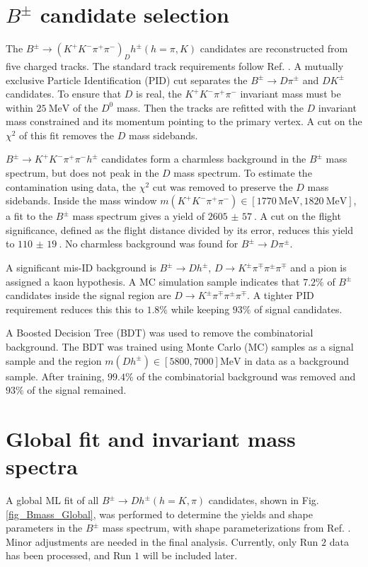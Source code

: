 \documentclass[12pt, a4paper, notitlepage, onecolumn]{article}
\begin{document}
\section{\texorpdfstring{$B^\pm$}{B} candidate selection}
\noindent The $B^\pm\to (K^+K^-\pi^+\pi^-)_Dh^\pm (h = \pi, K)$ candidates are reconstructed from five charged tracks. The standard track requirements follow Ref. \cite{cite_LHCbGGSZKSpipi}. A mutually exclusive Particle Identification (PID) cut separates the $B^\pm\to D\pi^\pm$ and $DK^\pm$ candidates. To ensure that $D$ is real, the $K^+K^-\pi^+\pi^-$ invariant mass must be within $\SI{25}{\mega\eV}$ of the $D^0$ mass. Then the tracks are refitted with the $D$ invariant mass constrained and its momentum pointing to the primary vertex. A cut on the $\chi^2$ of this fit removes the $D$ mass sidebands.

$B^\pm\to K^+K^-\pi^+\pi^-h^\pm$ candidates form a charmless background in the $B^\pm$ mass spectrum, but does not peak in the $D$ mass spectrum. To estimate the contamination using data, the $\chi^2$ cut was removed to preserve the $D$ mass sidebands. Inside the mass window $m(K^+K^-\pi^+\pi^-)\in[\SI{1770}{\mega\eV}, \SI{1820}{\mega\eV}]$, a fit to the $B^\pm$ mass spectrum gives a yield of $\SI{2605(57)}{}$. A cut on the flight significance, defined as the flight distance divided by its error, reduces this yield to $\SI{110(19)}{}$. No charmless background was found for $B^\pm\to D\pi^\pm$.

A significant mis-ID background is $B^\pm\to Dh^\pm$, $D\to K^\pm\pi^\mp\pi^\pm\pi^\mp$ and a pion is assigned a kaon hypothesis. A MC simulation sample indicates that $7.2\%$ of $B^\pm$ candidates inside the signal region are $D\to K^\pm\pi^\mp\pi^\pm\pi^\mp$. A tighter PID requirement reduces this this to $1.8\%$ while keeping $93\%$ of signal candidates.

A Boosted Decision Tree (BDT) was used to remove the combinatorial background. The BDT was trained using Monte Carlo (MC) samples as a signal sample and the region $m(Dh^\pm)\in[5800, 7000]\si{\mega\eV}$ in data as a background sample. After training, $99.4\%$ of the combinatorial background was removed and $93\%$ of the signal remained.

\section{Global fit and invariant mass spectra}
\label{section_global_fit}
\noindent A global ML fit of all $B^\pm\to Dh^\pm (h = K, \pi)$ candidates, shown in Fig. \ref{fig_Bmass_Global}, was performed to determine the yields and shape parameters in the $B^\pm$ mass spectrum, with shape parameterizations from Ref. \cite{cite_LHCbGGSZKSpipi}. Minor adjustments are needed in the final analysis. Currently, only Run $2$ data has been processed, and Run $1$ will be included later.
\end{document}
